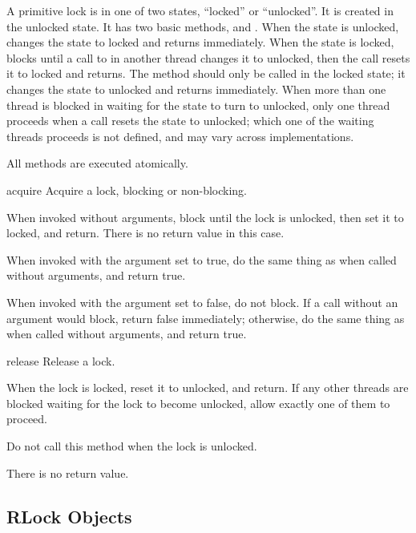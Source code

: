 A primitive lock is in one of two states, ``locked'' or ``unlocked''.
It is created in the unlocked state.  It has two basic methods,
 and .  When the state is
unlocked,  changes the state to locked and returns
immediately.  When the state is locked,  blocks
until a call to  in another thread changes it to
unlocked, then the  call resets it to locked and
returns.  The  method should only be called in the
locked state; it changes the state to unlocked and returns
immediately.  When more than one thread is blocked in
 waiting for the state to turn to unlocked, only one
thread proceeds when a  call resets the state to
unlocked; which one of the waiting threads proceeds is not defined,
and may vary across implementations.

All methods are executed atomically.

\begin{methoddesc}{acquire}{}
Acquire a lock, blocking or non-blocking.

When invoked without arguments, block until the lock is
unlocked, then set it to locked, and return.  There is no
return value in this case.

When invoked with the  argument set to true, do the
same thing as when called without arguments, and return true.

When invoked with the  argument set to false, do not
block.  If a call without an argument would block, return false
immediately; otherwise, do the same thing as when called
without arguments, and return true.
\end{methoddesc}

\begin{methoddesc}{release}{}
Release a lock.

When the lock is locked, reset it to unlocked, and return.  If
any other threads are blocked waiting for the lock to become
unlocked, allow exactly one of them to proceed.

Do not call this method when the lock is unlocked.

There is no return value.
\end{methoddesc}


\subsection{RLock Objects \label{rlock-objects}}

